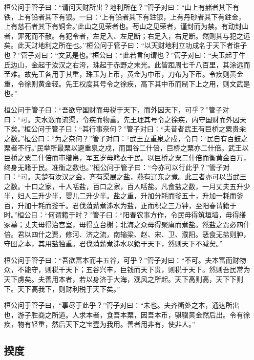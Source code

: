 \documentclass[]{article}
\begin{document}
桓公问于管子曰：``请问天财所出？地利所在？''管子对曰：``山上有赭者其下有铁，上有铅者其下有银。一曰：`上有铅者其下有鉒银，上有丹砂者其下有鉒金，上有慈石者其下有铜金。'此山之见荣者也。苟山之见荣者，谨封而为禁。有动封山者，罪死而不赦。有犯令者，左足入、左足断；右足入，右足断。然则其与犯之远矣。此天财地利之所在也。''桓公问于管子曰：``以天财地利立功成名于天下者谁子也？''管子对曰：``文武是也。''桓公曰：``此若言何谓也？''管子对曰：``夫玉起于牛氏边山，金起于汝汉之右洿，珠起于赤野之末光。此皆距周七千八百里，其涂远而至难。故先王各用于其重，珠玉为上币，黄金为中币，刀布为下币。令疾则黄金重，令徐则黄金轻。先王权度其号令之徐疾，高下其中币而制下上之用，则文武是也。''

桓公问于管子曰：``吾欲守国财而毋税于天下，而外因天下，可乎？''管子对曰：``可。夫水激而流渠，令疾而物重。先王理其号令之徐疾，内守国财而外因天下矣。''桓公问于管子曰：``其行事奈何？''管子对曰：``夫昔者武王有巨桥之粟贵籴之数。''桓公曰：``为之奈何？''管子对曰：``武王立重泉之戍，令曰：`民自有百鼓之粟者不行。'民举所最粟以避重泉之戍，而国谷二什倍，巨桥之粟亦二什倍。武王以巨桥之粟二什倍而市缯帛，军五岁毋籍衣于民。以巨桥之粟二什倍而衡黄金百万，终身无籍于民。准衡之数也。''桓公问于管子曰：``今亦可以行此乎？''管子对曰：``可。夫楚有汝汉之金，齐有渠展之盐，燕有辽东之煮。此三者亦可以当武王之数。十口之家，十人咶盐，百口之家，百人咶盐。凡食盐之数，一月丈夫五升少半，妇人三升少半，婴儿二升少半。盐之重，升加分耗而釜五十，升加一耗而釜百，升加十耗而釜千。君伐菹薪煮泲水为盐，正而积之三万钟，至阳春请籍于时。''桓公曰：``何谓籍于时？''管子曰：``阳春农事方作，令民毋得筑垣墙，毋得缮冢墓；丈夫毋得治宫室，毋得立台榭；北海之众毋得聚庸而煮盐。然盐之贾必四什倍。君以四什之贾，修河、济之流，南输梁、赵、宋、卫、濮阳。恶食无盐则肿，守圉之本，其用盐独重。君伐菹薪煮泲水以籍于天下，然则天下不减矣。''

桓公问于管子曰：``吾欲富本而丰五谷，可乎？''管子对曰：``不可。夫本富而财物众，不能守，则税干天下；五谷兴丰，巨钱而天下贵，则税于天下。然则吾民常为天下虏矣。夫善用本者，若以身济于大海，观风之所起。天下高则高，天下下则下。天下高我下，则财利税于天下矣。''

桓公问于管子曰，``事尽于此乎？''管子对曰：``未也。夫齐衢处之本，通达所出也，游子胜商之所道。人求本者，食吾本粟，因吾本币，骐骥黄金然后出。令有徐疾，物有轻重，然后天下之宝壹为我用。善者用非有，使非人。''

\hypertarget{header-n1029}{%
\subsection{揆度}\label{header-n1029}}
\end{document}
